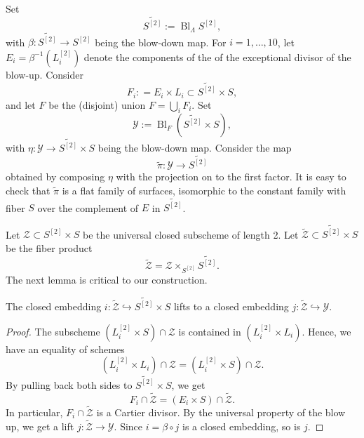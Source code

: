 \documentclass[12pt,reqno]{amsart}
\DeclareMathOperator{\Bl}{Bl}
\renewcommand{\to}{{\longrightarrow}}
\numberwithin{equation}{section}
\begin{document}
Set
\begin{equation}
  \label{eq:S2tilde}
  \widetilde {S^{[2]}} := \Bl_{\Lambda}S^{[2]},
\end{equation}
with $\beta \colon \widetilde {S^{[2]}} \to S^{[2]}$ being the blow-down map.
For $i=1, \dots, 10$, let $E_{i} = \beta^{-1}(L^{[2]}_{i})$ denote the
components of the of the exceptional divisor of the blow-up.
Consider
\[ F_i: = E_i \times L_i \subset \widetilde {S^{[2]}} \times S,\]
and let $F$ be the (disjoint) union $F = \bigcup_i F_i$.
Set
\begin{equation}
  \label{eq:Xtilde}
  \mathcal{Y} := \Bl_{F}\left( \widetilde{S^{[2]}} \times S \right),
\end{equation}
with $\eta \colon \mathcal Y \to  \widetilde{S^{[2]}} \times S$ being the blow-down map.
Consider the map
\[ \widetilde \pi \colon \mathcal Y \to \widetilde {S^{[2]}}\]
obtained by composing $\eta$ with the projection on to the first factor.
It is easy to check that $\widetilde \pi$ is a flat family of surfaces, isomorphic to the constant family with fiber $S$ over the complement of $E$ in $\widetilde{S^{[2]}}$.

Let $\mathcal Z \subset S^{[2]} \times S$ be the universal closed subscheme of length 2.
Let $\widetilde {\mathcal Z} \subset \widetilde{S^{[2]}} \times S$ be the fiber product
\[ \widetilde {\mathcal Z} = \mathcal Z \times_{S^{[2]}} \widetilde {S^{[2]}}.\]
The next lemma is critical to our construction.
\begin{lemma}
  The closed embedding
  $i: \widetilde{\mathcal{Z}} \hookrightarrow \widetilde{S^{[2]}}
  \times S$ lifts to a closed embedding
  $j: \widetilde{\mathcal{Z}} \hookrightarrow  \mathcal{Y}$.
\end{lemma}
\begin{proof}
  The subscheme $(L^{[2]}_i \times S) \cap \mathcal Z$ is contained in $(L^{[2]}_i \times L_i)$.
  Hence, we have an equality of schemes
  \[
    (L^{[2]}_i \times L_i) \cap \mathcal Z = (L^{[2]}_i \times S) \cap \mathcal Z.
  \]
  By pulling back both sides to $\widetilde{S^{[2]}} \times S$, we get
  \begin{equation}
    \label{eq:Cartier}
    F_i \cap \widetilde{\mathcal{Z}} = (E_i \times S) \cap \widetilde{\mathcal{Z}}.
  \end{equation}
  In particular, $F_i \cap \widetilde {\mathcal Z}$ is a Cartier divisor.
  By the universal property of the blow up, we get a lift $j \colon \widetilde{\mathcal Z} \to \mathcal Y$.
  Since $i = \beta \circ j$ is a closed embedding, so is $j$.
\end{proof}
\end{document}
